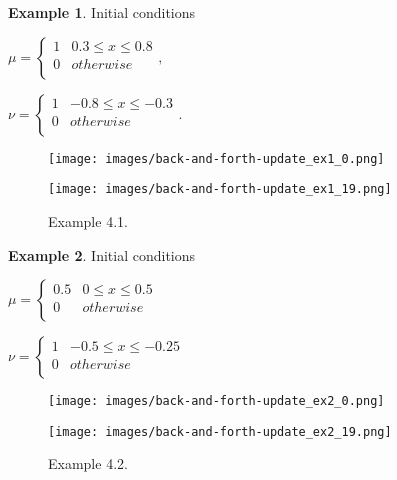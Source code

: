 \documentclass[a4j,10pt, twocolumn, dvipdfmx]{article}
\theoremstyle{definition}
\newtheorem{ex}{Example}[section]
\begin{document}
\begin{ex}
    Initial conditions

    $\mu = \left\{
        \begin{array}{ll}
            1 & 0.3 \le x \le 0.8\\
            0 & otherwise \\
        \end{array},
    \right.
    $

    $\nu = \left\{
        \begin{array}{ll}
            1 & - 0.8 \le x \le - 0.3 \\
            0 & otherwise \\
        \end{array}.
    \right.
    $


\end{ex}
\begin{figure}[htb]
    \begin{center}
        \begin{minipage}{0.45\hsize}
            \texttt{[image: images/back-and-forth-update\_ex1\_0.png]}
        \end{minipage}
        \begin{minipage}{0.45\hsize}
            \texttt{[image: images/back-and-forth-update\_ex1\_19.png]}
        \end{minipage}
    \end{center}
    \caption{Example 4.1.}
\end{figure}
\label{Example 1}

\begin{ex}
    Initial conditions

    $\mu = \left\{
        \begin{array}{ll}
            0.5 & 0 \le x \le 0.5 \\
            0 & otherwise \\
        \end{array}
    \right.
    $

    $\nu = \left\{
        \begin{array}{ll}
            1 & - 0.5 \le x \le - 0.25 \\
            0 & otherwise \\
        \end{array}
    \right.
    $

    \begin{figure}[htb]
        \begin{center}
            \begin{minipage}{0.45\hsize}
                \texttt{[image: images/back-and-forth-update\_ex2\_0.png]}
            \end{minipage}
            \begin{minipage}{0.45\hsize}
                \texttt{[image: images/back-and-forth-update\_ex2\_19.png]}
            \end{minipage}
        \end{center}
        \caption{Example 4.2.}
    \end{figure}

\end{ex}
\end{document}
